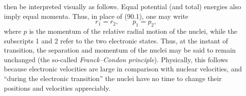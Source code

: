 then be interpreted visually as follows. Equal potential (and total) energies also imply equal momenta. Thus, in place of (90.1), one may write
\begin{equation}r_1=r_2,\qquad p_1=p_2,\tag{90.2}\end{equation}
where $p$ is the momentum of the relative radial motion of the nuclei, while the subscripts 1 and 2 refer to the two electronic states. Thus, at the instant of transition, the separation and momentum of the nuclei may be said to remain unchanged (the so-called \emph{Franck--Condon principle}). Physically, this follows because electronic velocities are large in comparison with nuclear velocities, and ``during the electronic transition'' the nuclei have no time to change their positions and velocities appreciably.
